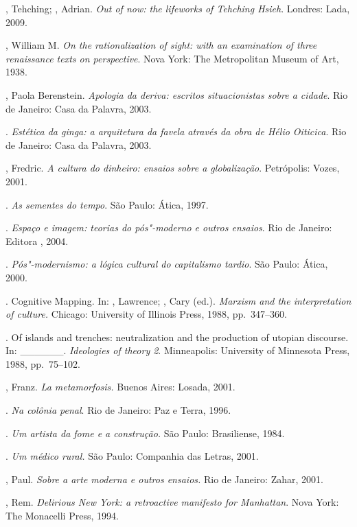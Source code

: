 \begin{bibliohedra}
, Tehching; , Adrian. \emph{Out of now: the lifeworks
of Tehching Hsieh}. Londres: Lada, 2009.

, William M. \emph{On the rationalization of sight: with an
examination of three renaissance texts on perspective}. Nova York: The
Metropolitan Museum of Art, 1938.

, Paola Berenstein. \emph{Apologia da deriva: escritos
situacionistas sobre a cidade}. Rio de Janeiro: Casa da Palavra, 2003.

\tit{\_\_\_\_\_\_}. \emph{Estética da ginga: a arquitetura da favela
através da obra de Hélio Oiticica}. Rio de Janeiro: Casa da Palavra,
2003.

, Fredric. \emph{A cultura do dinheiro: ensaios sobre a
globalização}. Petrópolis: Vozes, 2001.

\tit{\_\_\_\_\_\_}. \emph{As sementes do tempo}. São Paulo: Ática, 1997.

\tit{\_\_\_\_\_\_}. \emph{Espaço e imagem: teorias do pós"-moderno e
outros ensaios}. Rio de Janeiro: Editora , 2004.

\tit{\_\_\_\_\_\_}. \emph{Pós"-modernismo: a lógica cultural do
capitalismo tardio}. São Paulo: Ática, 2000.

\tit{\_\_\_\_\_\_}. Cognitive Mapping. In: , Lawrence; ,
Cary (ed.). \emph{Marxism and the interpretation of culture.} Chicago:
University of Illinois Press, 1988, pp.~347--360.

\tit{\_\_\_\_\_\_}. Of islands and trenches: neutralization and the
production of utopian discourse. In: \_\_\_\_\_\_.
\emph{Ideologies of theory 2}. Minneapolis: University of Minnesota
Press, 1988, pp.~75--102.

, Franz. \emph{La metamorfosis.} Buenos Aires: Losada, 2001.

\tit{\_\_\_\_\_\_}. \emph{Na colônia penal}. Rio de Janeiro: Paz e Terra, 1996.

\tit{\_\_\_\_\_\_}. \emph{Um artista da fome e a construção.} São Paulo:
Brasiliense, 1984.

\tit{\_\_\_\_\_\_}. \emph{Um médico rural.} São Paulo: Companhia das
Letras, 2001.

, Paul. \emph{Sobre a arte moderna e outros ensaios.} Rio de
Janeiro: Zahar, 2001.

, Rem. \emph{Delirious New York: a retroactive manifesto for
Manhattan}. Nova York: The Monacelli Press, 1994.


\end{bibliohedra}
